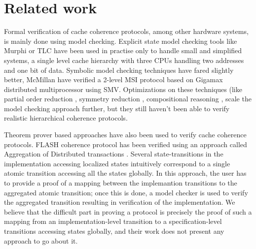 \section{Related work}
\label{relatedWork}
Formal verification of cache coherence protocols, among other hardware systems,
is mainly done using model checking. Explicit state model checking tools like
Murphi \cite{murphi} or TLC \cite{tlc} have been used in practise only to
handle small and simplified systems, \eg{} a single level cache hierarchy with
three CPUs handling two addresses and one bit of data. Symbolic model checking
techniques have fared slightly better, McMillan \etal{} have verified a 2-level
MSI protocol based on Gigamax distributed multiprocessor using SMV.
Optimizations on these techniques (like partial order reduction \cite{part},
symmetry reduction \cite{sym1, sym2}, compositional reasoning \cite{somethink}, \etc
scale the model checking approach further, but they still haven't been able to
verify realistic hierarchical coherence protocols.

Theorem prover based approaches have also been used to verify cache coherence
protocols. FLASH coherence protocol \cite{flash} has been verified using an
approach called Aggregation of Distributed transactions \cite{park}.  Several
state-transitions in the implementation accessing localized states intuitively
correspond to a single atomic transition accessing all the states globally. In
this approach, the user has to provide a proof of a mapping between the
implemantion transitions to the aggregated atomic transition; once this is
done, a model checker is used to verify the aggregated transition resulting in
verification of the implementation. We believe that the difficult part in
proving a protocol is precisely the proof of such a mapping from an
implementation-level transition to a specification-level transitions accessing
states globally, and their work does not present any approach to go about it.

